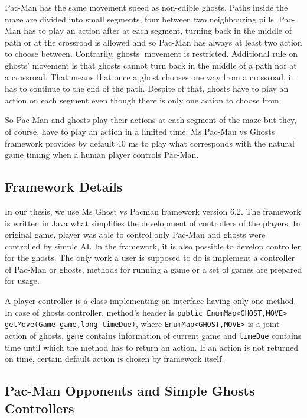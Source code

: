 Pac-Man has the same movement speed as non-edible ghosts. Paths inside the maze are divided
into small segments, four between two neighbouring pills. Pac-Man has to play an action after
at each segment, turning back in the middle of path or at the crossroad is allowed and so
Pac-Man has always at least two action to choose between. Contrarily, ghosts' movement is
restricted. Additional rule on ghosts' movement is that ghosts cannot turn back in the middle
of a path nor at a crossroad. That means that once a ghost chooses one way from a crossroad, it
has to continue to the end of the path. Despite of that, ghosts have to play an action on each
segment even though there is only one action to choose from.


So Pac-Man and ghosts play their actions at each segment of the maze but they, of course, have
to play an action in a limited time. Ms Pac-Man vs Ghosts framework provides by default 40 ms
to play what corresponds with the natural game timing when a human player controls Pac-Man.


\subsection{Framework Details}

In our thesis, we use Ms Ghost vs Pacman framework version 6.2. The framework is written in
Java what simplifies the development of controllers of the players. In original game, player
was able to control only Pac-Man and ghosts were controlled by simple AI. In the framework,
it is also possible to develop controller for the ghosts. The only work a user is supposed to 
do is
implement a controller of Pac-Man or ghosts, methods for running a game or a set of games are
prepared for usage. 

A player controller is a class implementing an interface having only one
method. In case of ghosts controller, method's header is \texttt{public EnumMap<GHOST,MOVE>
getMove(Game game,long timeDue)}, where \texttt{EnumMap<GHOST,MOVE>} is a joint-action of
ghosts, \texttt{game} contains information of current game and \texttt{timeDue} contains time
until which the method has to return an action.
If an action is not returned on time, certain
default action is chosen by framework itself.



\subsection{Pac-Man Opponents and Simple Ghosts Controllers}


